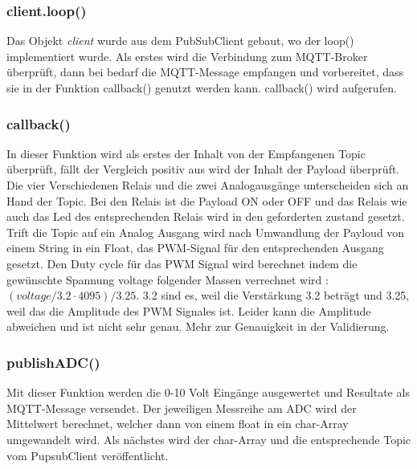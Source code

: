 \subsubsection{client.loop()}
 Das Objekt \textit{client} wurde aus dem PubSubClient gebaut, wo der loop() implementiert wurde. Als erstes wird die Verbindung zum MQTT-Broker überprüft, dann bei bedarf die MQTT-Message empfangen und vorbereitet, dass sie in der Funktion callback()  genutzt werden kann. callback() wird aufgerufen.
 \subsubsection{callback()}
 In dieser Funktion wird als erstes der Inhalt von der Empfangenen Topic überprüft, fällt der Vergleich positiv aus wird der Inhalt der Payload überprüft. Die vier Verschiedenen Relais und die zwei Analogausgänge unterscheiden sich an Hand der Topic. Bei den Relais ist die Payload ON oder OFF und das Relais wie auch das Led des entsprechenden Relais wird in den geforderten zustand gesetzt. Trift die Topic auf ein Analog Ausgang wird nach Umwandlung der Payloud von einem String in ein Float, das PWM-Signal für den entsprechenden Ausgang gesetzt. Den Duty cycle für das PWM Signal wird berechnet indem die gewünschte Spannung voltage folgender Massen verrechnet wird : $(voltage/3.2 \cdot 4095)/3.25$. 3.2 sind es, weil die Verstärkung 3.2 beträgt und 3.25, weil das die Amplitude des PWM Signales ist. Leider kann die Amplitude abweichen und ist nicht sehr genau. Mehr zur Genauigkeit in der Validierung.
 
 \subsubsection{publishADC()}
Mit dieser Funktion werden die 0-10 Volt Eingänge ausgewertet und Resultate als MQTT-Message versendet. Der jeweiligen Messreihe am ADC wird der Mittelwert berechnet, welcher dann von einem float in ein char-Array umgewandelt wird. Als nächstes wird der char-Array und die entsprechende Topic vom PupsubClient veröffentlicht.


\newpage


